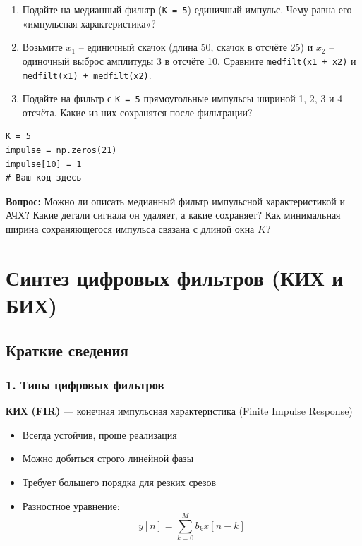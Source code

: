 \documentclass[12pt,a4paper,openany]{book}
\providecommand{\tightlist}{\setlength{\itemsep}{0pt}\setlength{\parskip}{0pt}}
\begin{document}
\begin{enumerate}
\def\labelenumi{\arabic{enumi}.}
\tightlist
\item
  Подайте на медианный фильтр (\texttt{K\ =\allowbreak{}\ 5}) единичный импульс. Чему равна его «импульсная характеристика»?
\item
  Возьмите \(x_1\) -- единичный скачок (длина 50, скачок в отсчёте 25) и \(x_2\) -- одиночный выброс амплитуды 3 в отсчёте 10. Сравните \texttt{medfilt(\allowbreak{}x1\ +\ x2)} и \texttt{medfilt(\allowbreak{}x1)\ +\ medfilt(\allowbreak{}x2)}.
\item
  Подайте на фильтр с \texttt{K\ =\allowbreak{}\ 5} прямоугольные импульсы шириной 1, 2, 3 и 4 отсчёта. Какие из них сохранятся после фильтрации?
\end{enumerate}

\begin{Verbatim}[fontsize=\small, breaklines, breakanywhere, frame=single, framesep=2mm]
K = 5
impulse = np.zeros(21)
impulse[10] = 1
# Ваш код здесь
\end{Verbatim}

\textbf{Вопрос:} Можно ли описать медианный фильтр импульсной характеристикой и АЧХ? Какие детали сигнала он удаляет, а какие сохраняет? Как минимальная ширина сохраняющегося импульса связана с длиной окна \(K\)?


\chapter{Синтез цифровых фильтров (КИХ и БИХ)}

\section*{Краткие сведения}

\subsection*{1. Типы цифровых фильтров}

\textbf{КИХ (FIR)} --- конечная импульсная характеристика (Finite Impulse Response)

\begin{itemize}
\tightlist
\item
  Всегда устойчив, проще реализация
\item
  Можно добиться строго линейной фазы
\item
  Требует большего порядка для резких срезов
\item
  Разностное уравнение:
  \[
  y[n] = \sum_{k=0}^{M} b_k x[n-k]
  \]
\end{itemize}
\end{document}
